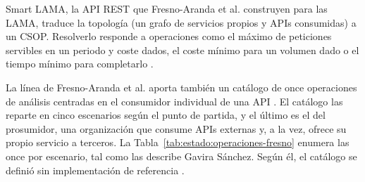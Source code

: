 Smart LAMA, la API REST que Fresno-Aranda et al. construyen para las LAMA,
traduce la topología (un grafo de
servicios propios y APIs consumidas) a un CSOP. Resolverlo responde a
operaciones como el máximo de peticiones servibles en un periodo y coste
dados, el coste mínimo para un volumen dado o el tiempo mínimo para
completarlo \citep{fresno2023gecon,fresno2022lama,fresno2025tesis}.

La línea de Fresno-Aranda et al. aporta también un catálogo de once
operaciones de análisis centradas en el consumidor individual de una API
\citep{fresno2023catalogo}. El catálogo las reparte en cinco escenarios
según el punto de partida, y el último es el del prosumidor, una
organización que consume APIs externas y, a la vez, ofrece su propio
servicio a terceros. La Tabla~\ref{tab:estado:operaciones-fresno}
enumera las once por escenario, tal como las describe Gavira Sánchez.
Según él, el catálogo se definió sin implementación de referencia
\citep{gavira2026tfm}.


